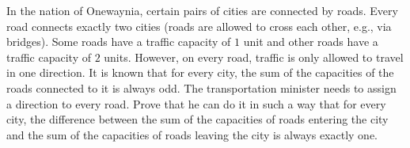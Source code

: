 In the nation of Onewaynia, certain pairs of cities are connected by roads. Every road connects exactly two cities (roads are allowed to cross each other, e.g., via bridges). Some roads have a traffic capacity of $1$ unit and other roads have a traffic capacity of $2$ units. However, on every road, traffic is only allowed to travel in one direction. It is known that for every city, the sum of the capacities of the roads connected to it is always odd. The transportation minister needs to assign a direction to every road. Prove that he can do it in such a way that for every city, the difference between the sum of the capacities of roads entering the city and the sum of the capacities of roads leaving the city is always exactly one.